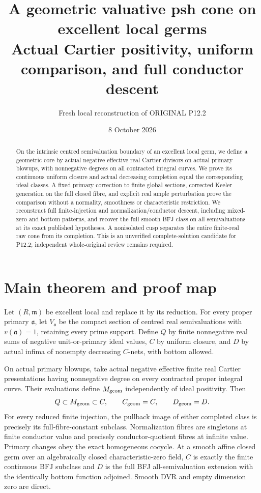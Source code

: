 \documentclass[11pt]{article}
\title{A geometric valuative psh cone on excellent local germs\\
Actual Cartier positivity, uniform comparison, and full conductor descent}
\author{Fresh local reconstruction of ORIGINAL P12.2}
\date{8 October 2026}
\begin{document}
\maketitle
\begin{abstract}
On the intrinsic centred semivaluation boundary of an excellent local germ,
we define a geometric core by actual negative effective real Cartier divisors
on actual primary blowups, with nonnegative degrees on all contracted integral
curves. We prove its continuous uniform closure and actual decreasing completion
equal the corresponding ideal classes. A fixed primary correction to finite
global sections, corrected Keeler generation on the full closed fibre, and
explicit real ample perturbation prove the comparison without a normality,
smoothness or characteristic restriction. We reconstruct full finite-injection
and normalization/conductor descent, including mixed-zero and bottom patterns,
and recover the full smooth BFJ class on all semivaluations at its exact published
hypotheses. A nonisolated cusp separates the entire finite-real raw cone from its
completion. This is an unverified complete-solution candidate for P12.2;
independent whole-original review remains required.
\end{abstract}
\tableofcontents
\newpage
\section*{Main theorem and proof map}
Let $(R,\mathfrak m)$ be excellent local and replace it by its reduction.
For every proper primary $\mathfrak a$, let $V_{\mathfrak a}$ be the compact
section of centred real semivaluations with $v(\mathfrak a)=1$, retaining every
prime support. Define $Q$ by finite nonnegative real sums of negative
unit-or-primary ideal values, $C$ by uniform closure, and $D$ by actual infima
of nonempty decreasing $C$-nets, with bottom allowed.

On actual primary blowups, take actual negative effective finite real Cartier
presentations having nonnegative degree on every contracted proper integral
curve. Their evaluations define $M_{\rm geom}$ independently of ideal
positivity. Then
\[
 Q\subset M_{\rm geom}\subset C,\qquad
 C_{\rm geom}=C,\qquad D_{\rm geom}=D.
\]
For every reduced finite injection, the pullback image of either completed
class is precisely its full-fibre-constant subclass. Normalization fibres are
singletons at finite conductor value and precisely conductor-quotient fibres
at infinite value. Primary changes obey the exact homogeneous cocycle.
At a smooth affine closed germ over an algebraically closed characteristic-zero
field, $C$ is exactly the finite continuous BFJ subclass and $D$ is the full
BFJ all-semivaluation extension with the identically bottom function adjoined.
Smooth DVR and empty dimension zero are direct.
\end{document}
